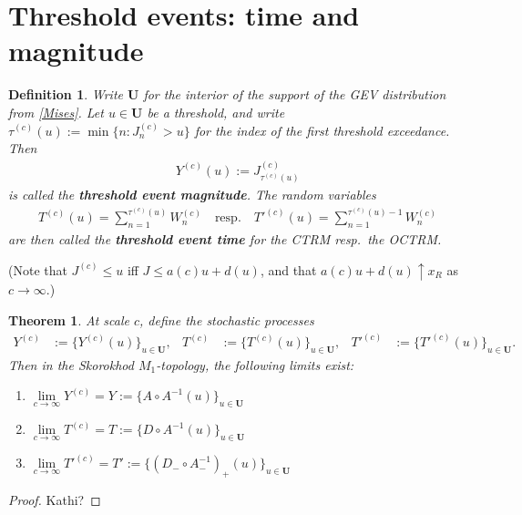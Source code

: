 \documentclass[12pt, a4paper]{article}
\newtheorem{theorem}[equation]{Theorem}
\newtheorem{definition}[equation]{Definition}
\newcommand{\1}{\mathbf 1}
\begin{document}
\section{Threshold events: time and magnitude}

\begin{definition}
Write $\mathbf U$ for the interior of the support of the GEV distribution from 
\eqref{Mises}. 
Let $u \in \mathbf U$ be a threshold, and write 
$
\tau^{(c)}(u) := \min\{n: J^{(c)}_n > u\}
$
for the index of the first threshold exceedance. 
Then
\begin{align*}
  Y^{(c)}(u) := J^{(c)}_{\tau^{(c)}(u)}
\end{align*}
is called the \textbf{threshold event magnitude}. The random variables 
\begin{align}
  T^{(c)}(u) = \sum_{n=1}^{\tau^{(c)}(u)} W^{(c)}_n \quad \text{resp.} \quad 
  T'^{(c)}(u) = \sum_{n=1}^{\tau^{(c)}(u)-1} W^{(c)}_n
\end{align}
are then called the \textbf{threshold event time} for the CTRM resp.\ the 
OCTRM. 
\end{definition}

(Note that $J^{(c)} \le u$ iff $J \le a(c) u + d(u)$, and that 
$a(c) u + d(u) \uparrow x_R$ as $c \to \infty$.) 

\begin{theorem}
  At scale $c$, define the stochastic processes 
  \begin{align*}
    Y^{(c)} &:= \{Y^{(c)}(u)\}_{u \in \mathbf U}, 
    & T^{(c)} &:= \{T^{(c)}(u)\}_{u \in \mathbf U}, 
    & T'^{(c)} &:= \{T'^{(c)}(u)\}_{u \in \mathbf U}.
  \end{align*}
Then in the Skorokhod $M_1$-topology, the following limits exist:
  \begin{enumerate}
    \item 
    $\lim \limits_{c \to \infty} Y^{(c)} = Y := \{A \circ A^{-1}(u)\}_{u \in \mathbf U}$
    \item
    $\lim \limits_{c \to \infty} T^{(c)} = T := \{D \circ A^{-1}(u)\}_{u \in \mathbf U}$
    \item
    $\lim \limits_{c \to \infty} T'^{(c)} = T' 
    := \{(D_- \circ A^{-1}_-)_+(u)\}_{u \in \mathbf U}$
  \end{enumerate}
\end{theorem}

\begin{proof}
  Kathi?
\end{proof}
\end{document}
